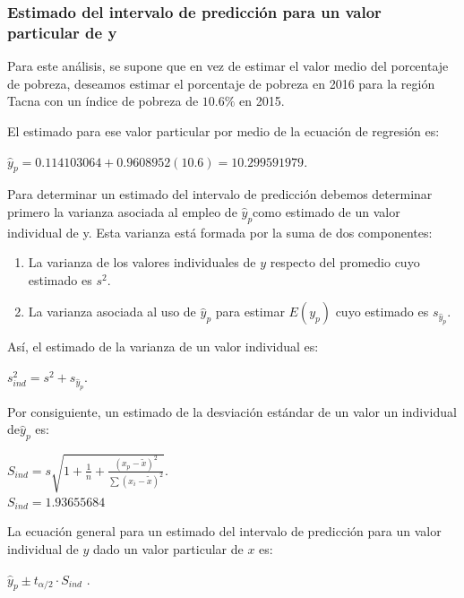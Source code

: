 \documentclass[twocolumn,twoside]{article}
\begin{document}
\subsubsection{Estimado del intervalo de predicci\'on para un valor particular de y}

Para este an\'alisis, se supone que en vez de estimar el valor medio del porcentaje de pobreza, deseamos
estimar el porcentaje de pobreza en 2016 para la regi\'on Tacna con un \'indice de pobreza de $10.6\%$ en 2015.

El estimado para ese valor particular por medio de la ecuaci\'on de regresi\'on es:
\begin{center}
  $\hat y_p=0.114103064+0.9608952(10.6)= 10.299591979$.

\end{center}

Para determinar un estimado del intervalo de predicci\'on debemos determinar primero la
varianza asociada al empleo de $\hat y_p$como estimado de un valor individual de y. Esta varianza est\'a
formada por la suma de dos componentes:
\begin{enumerate}[nosep,label=\arabic*)]
  \item La varianza de los valores individuales de $y$  respecto del promedio cuyo estimado es $s^2$.
  \item La varianza asociada al uso de $\hat y_p$ para estimar $ E(y_p )$ 
  cuyo estimado es $s_{\hat y_p}$.
\end{enumerate}
As\'i, el estimado de la varianza de un valor individual es:
\begin{center}
  $s_{ind}^2=s^2+s_{\hat y_p}$.

\end{center}

Por consiguiente, un estimado de la desviaci\'on est\'andar de un valor un individual de${\hat y_p}$ es:

\begin{center}
  $S_{ind}=s\sqrt{1+\frac{1}{n}+\frac{(x_p-\tilde x)^2}{\sum (x_i-\tilde x)^2}}$.\\
  $S_{ind}=1.93655684$
\end{center}

La ecuaci\'on general para un estimado del intervalo de predicci\'on para un valor individual de $y$ dado
un valor particular de $x$ es:
\begin{center}
  $\hat y_p\pm t_{\alpha/2}\cdot S_{ind}$  .\\
\end{center}
\end{document}
